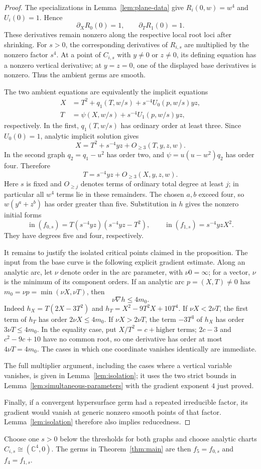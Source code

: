\begin{proof}
The specializations in Lemma~\ref{lem:plane-data} give
\(R_i(0,w)=w^4\) and \(U_i(0)=1\).  Hence
\[
 \partial_XR_0(0)=1,\qquad \partial_TR_1(0)=1.
\]
These derivatives remain nonzero along the respective local
root loci after shrinking.  For \(s>0\), the corresponding derivatives
of \(R_{i,s}\) are multiplied by the nonzero factor \(s^4\).
At a point of \(C_{i,s}\) with
\(y\ne0\) or \(z\ne0\), its defining equation has a nonzero
vertical derivative; at \(y=z=0\), one of the displayed base
derivatives is nonzero. Thus the ambient germs are smooth.

The two ambient equations are equivalently the implicit equations
\begin{align*}
 X&=T^2+q_1(T,w/s)+s^{-4}U_0(p,w/s)yz,\\
 T&=\psi(X,w/s)+s^{-4}U_1(p,w/s)yz,
\end{align*}
respectively.  In the first, \(q_1(T,w/s)\) has ordinary order at least
three.  Since \(U_0(0)=1\), analytic implicit solution gives
\[
 X=T^2+s^{-4}yz+O_{\ge3}(T,y,z,w).
\]
In the second graph \(q_2=q_1-u^2\) has order two, and
\(\psi=u(u-w^2)q_2\) has order four. Therefore
\[
 T=s^{-4}yz+O_{\ge3}(X,y,z,w).
\]
Here \(s\) is fixed and \(O_{\ge j}\) denotes terms of ordinary
total degree at least \(j\); in particular all \(w^4\) terms
lie in these remainders. The chosen \(a,b\) exceed four, so
\(w(y^a+z^b)\) has order greater than five. Substitution in \(h\)
gives the nonzero initial forms
\[
 \operatorname{in}(f_{0,s})
   =T(s^{-4}yz)(s^{-4}yz-T^2),\qquad
 \operatorname{in}(f_{1,s})=s^{-4}yzX^2.
\]
They have degrees five and four, respectively.

It remains to justify the isolated critical points claimed in the
proposition.  The input from the base curve is the following explicit
gradient estimate.  Along an analytic arc, let \(\nu\) denote order in
the arc parameter, with \(\nu 0=\infty\); for a vector, \(\nu\) is the
minimum of its component orders.  If an analytic arc \(p=(X,T)\ne0\) has
\(m_0=\nu p=\min(\nu X,\nu T)\), then
\begin{equation}\label{eq:plane-gradient}
 \nu\nabla h\le4m_0.
\end{equation}
Indeed
\(h_X=T(2X-3T^2)\) and
\(h_T=X^2-9T^2X+10T^4\).
If \(\nu X<2\nu T\), the first term of \(h_T\) has order
\(2\nu X\le4m_0\). If \(\nu X>2\nu T\), the term
\(-3T^3\) of \(h_X\) has order \(3\nu T\le4m_0\).
In the equality case, put \(X/T^2=c+\text{higher terms}\);
\(2c-3\) and \(c^2-9c+10\) have no common root, so one
derivative has order at most \(4\nu T=4m_0\).
The cases in which one coordinate vanishes identically are
immediate.

The full multiplier argument, including the cases where a vertical
variable vanishes, is given in Lemma~\ref{lem:isolation}; it uses the
two strict bounds in Lemma~\ref{lem:simultaneous-parameters} with the
gradient exponent \(4\) just proved.

Finally, if a convergent hypersurface germ had a repeated
irreducible factor, its gradient would vanish at generic
nonzero smooth points of that factor. Lemma~\ref{lem:isolation} therefore also implies reducedness.
\end{proof}

Choose one \(s>0\) below the thresholds for both graphs and choose
analytic charts \(C_{i,s}\cong(\mathbb C^4,0)\).  The germs in
Theorem~\ref{thm:main} are then \(f_5=f_{0,s}\) and \(f_4=f_{1,s}\).

